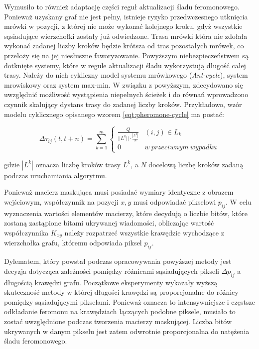 {{{            Wymusiło to również adaptację części reguł aktualizacji śladu feromonowego. Ponieważ uzyskany graf nie jest
            pełny, istnieje ryzyko przedwczesnego utknięcia mrówki w pozycji, z której nie może wykonać kolejnego kroku,
            gdyż wszystkie sąsiadujące wierzchołki zostały już odwiedzone. Trasa mrówki która nie zdołała wykonać
            zadanej liczby kroków będzie krótsza od tras pozostałych mrówek, co przełoży się na jej niesłuszne
            faworyzowanie. Powyższym niebezpieczeństwem są dotknięte systemy, które w regule aktualizacji śladu
            wykorzystują długość całej trasy. Należy do nich cykliczny model systemu mrówkowego (\textit{Ant-cycle}),
            system mrowiskowy oraz system max-min. W związku z powyższym, zdecydowano się uwzględnić możliwość
            wystąpienia niepełnych ścieżek i do równań wprowadzono czynnik skalujący dystans trasy do zadanej liczby
            kroków. Przykładowo, wzór modelu cyklicznego opisanego wzorem \ref{eqt:pheromone-cycle} ma postać:

            \begin{equation}\label{eqt:pheromone-cycle-adjusted}
                \Delta\tau_{ij}(t, t + n) = \sum_{k=1}^m \left\{
                        \begin{matrix}
                            \frac{Q}{||L^k|| \cdot \frac{|L^k|}{N}} & (i, j) \in L_k\\
                            0 & w\ przeciwnym\ wypadku
                        \end{matrix}
                    \right.
            \end{equation}

            gdzie $|L^k|$ oznacza liczbę kroków trasy $L^k$, a $N$ docelową liczbę kroków zadaną podczas uruchamiania
            algorytmu.

            Ponieważ macierz maskująca musi posiadać wymiary identyczne z obrazem wejściowym, współczynnik na pozycji
            $x, y$ musi odpowiadać pikselowi $p_{ij}$. W celu wyznaczenia wartości elementów macierzy, które decydują o
            liczbie bitów, które zostaną zastąpione bitami ukrywanej wiadomości, obliczając wartość współczynnika
            $K_{xy}$ należy rozpatrzeć wszystkie krawędzie wychodzące z wierzchołka grafu, któremu odpowiada piksel
            $p_{ij}$.

            Dylematem, który powstał podczas opracowywania powyższej metody jest decyzja dotycząca zależności pomiędzy
            różnicami sąsiadujących pikseli $\Delta p_{ij}$ a długością krawędzi grafu. Początkowe eksperymenty wykazały
            wyższą skuteczność metody w której długości krawędzi są proporcjonalne do różnicy pomiędzy sąsiadującymi
            pikselami. Ponieważ oznacza to intensywniejsze i częstsze odkładanie feromonu na krawędziach łączących
            podobne piksele, musiało to zostać uwzględnione podczas tworzenia macierzy maskującej. Liczba bitów
            ukrywanych w danym pikselu jest zatem odwrotnie proporcjonalna do natężenia śladu feromonowego.

}}}

